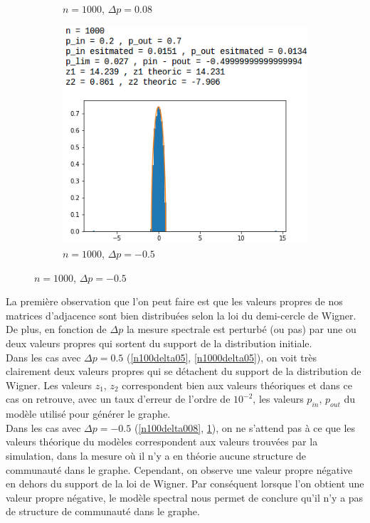 \begin{figure}[H]
\begin{subfigure}{.5\textwidth}
		\caption{$n=1000$, $\Delta p=0.08$}
		\label{n1000delta008}
	\end{subfigure}
	\begin{subfigure}{.5\textwidth}
		\centering
		\includegraphics[scale=0.58]{static/spectral_n1000_pin02_pout07.png}
		\caption{$n=1000$, $\Delta p=-0.5$}
		\label{n1000delta-05}
	\end{subfigure}
\end{figure}

La première observation que l'on peut faire est que les valeurs propres de nos matrices d'adjacence sont bien distribuées selon la loi du demi-cercle de Wigner.
De plus, en fonction de $\Delta p$ la mesure spectrale est perturbé (ou pas) par une ou deux valeurs propres qui sortent du support de la distribution initiale.\\

Dans les cas avec $\Delta p = 0.5$ (\ref{n100delta05}, \ref{n1000delta05}), on voit très clairement deux valeurs propres qui se détachent du support de la distribution de Wigner.
Les valeurs $z_1$, $z_2$ correspondent bien aux valeurs théoriques et dans ce cas on retrouve, avec un taux d'erreur de l'ordre de $10^{-2}$, les valeurs $p_{in}$, $p_{out}$ du modèle utilisé pour générer le graphe.\\

Dans les cas avec $\Delta p = -0.5$ (\ref{n100delta008}, \ref{n1000delta008}), on ne s'attend pas à ce que les valeurs théorique du modèles correspondent aux valeurs trouvées par la simulation, dans la mesure où il n'y a en théorie aucune structure de communauté dans le graphe.
Cependant, on observe une valeur propre négative en dehors du support de la loi de Wigner.
Par conséquent lorsque l'on obtient une valeur propre négative, le modèle spectral nous permet de conclure qu'il n'y a pas de structure de communauté dans le graphe.\\

